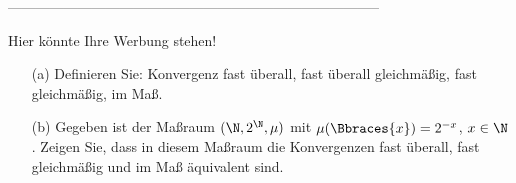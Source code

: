 --------------------------------------------------------------------------------

\begin{exercise}

Hier könnte Ihre Werbung stehen!

\begin{itemize}
  \item[(a)] Definieren Sie: Konvergenz fast überall, fast überall gleichmäßig, fast gleichmäßig, im Maß.
  \item[(b)]  Gegeben ist der Maßraum $(\N, 2^\N, \mu)$ mit $\mu(\Bbraces{x}) = 2^{-x}$, $x \in \N$. Zeigen Sie, dass in diesem Maßraum die Konvergenzen fast überall, fast gleichmäßig und im Maß äquivalent sind.
\end{itemize}

\end{exercise}

